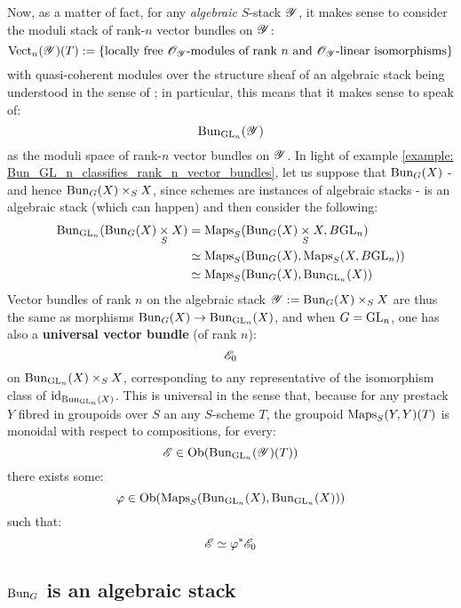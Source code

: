             Now, as a matter of fact, for any \textit{algebraic} $S$-stack $\mathscr{Y}$, it makes sense to consider the moduli stack of rank-$n$ vector bundles on $\mathscr{Y}$:
                $$\mathrm{Vect}_n(\mathscr{Y})(T) := \{ \text{locally free $\mathscr{O}_{\mathscr{Y}}$-modules of rank $n$ and $\mathscr{O}_{\mathscr{Y}}$-linear isomorphisms} \}$$
            with quasi-coherent modules over the structure sheaf of an algebraic stack being understood in the sense of \cite[\href{https://stacks.math.columbia.edu/tag/06WU}{Tag 06WU}]{stacks}; in particular, this means that it makes sense to speak of:
                $$\mathrm{Bun}_{\mathrm{GL}_n}(\mathscr{Y})$$
            as the moduli space of rank-$n$ vector bundles on $\mathscr{Y}$. In light of example \ref{example: Bun_GL_n_classifies_rank_n_vector_bundles}, let us suppose that $\mathrm{Bun}_G(X)$ - and hence $\Bun_G(X) \x_S X$, since schemes are instances of algebraic stacks - is an algebraic stack (which can happen) and then consider the following:
                $$
                    \begin{aligned}
                        \Bun_{\GL_n}(\Bun_G(X) \x_S X) & = \Maps_S( \Bun_G(X) \x_S X, B\GL_n )
                        \\
                        & \cong \Maps_S(\Bun_G(X), \Maps_S(X, B\GL_n))
                        \\
                        & \cong \Maps_S(\Bun_G(X), \Bun_{\GL_n}(X))
                    \end{aligned}
                $$
            Vector bundles of rank $n$ on the algebraic stack $\scrY := \Bun_G(X) \x_S X$ are thus the same as morphisms $\mathrm{Bun}_G(X) \to \mathrm{Bun}_{\mathrm{GL}_n}(X)$, and when $G = \mathrm{GL}_n$, one has also a \textbf{universal vector bundle} (of rank $n$):
                $$\mathscr{E}_0$$
            on $\Bun_{\GL_n}(X) \x_S X$, corresponding to any representative of the isomorphism class of $\mathrm{id}_{\mathrm{Bun}_{\mathrm{GL}_n}(X)}$. This is universal in the sense that, because for any prestack $Y$ fibred in groupoids over $S$ an any $S$-scheme $T$, the groupoid $\mathrm{Maps}_S(Y, Y)(T)$ is monoidal with respect to compositions, for every:
                $$\mathscr{E} \in \mathrm{Ob}( \mathrm{Bun}_{\mathrm{GL}_n}(\mathscr{Y})(T) )$$
            there exists some:
                $$\varphi \in \mathrm{Ob}( \mathrm{Maps}_S(\mathrm{Bun}_{\mathrm{GL}_n}(X), \mathrm{Bun}_{\mathrm{GL}_n}(X)) )$$
            such that:
                $$\mathscr{E} \simeq \varphi^* \mathscr{E}_0$$

        \subsection{\texorpdfstring{$\mathrm{Bun}_G$}{} is an algebraic stack}
    
    \printbibliography

